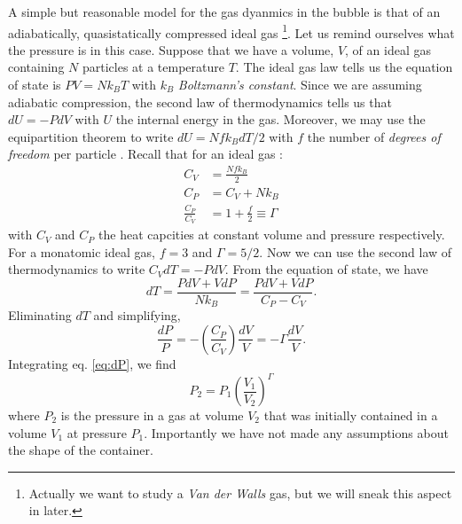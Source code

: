 \documentclass[rmp,aps,nofootinbib,superscriptaddress,floatfix]{revtex4-2}
\begin{document}
A simple but reasonable model for the gas dyanmics in the bubble is that of an adiabatically, quasistatically compressed ideal gas \cite{brenner2002single} \footnote{Actually we want to study a \emph{Van der Walls} gas, but we will sneak this aspect in later.}. Let us remind ourselves what the pressure is in this case. Suppose that we have a volume, $V$, of an ideal gas containing $N$ particles at a temperature $T$. The ideal gas law tells us the equation of state is $PV=Nk_BT$ with $k_B$ \emph{Boltzmann's constant}. Since we are assuming adiabatic compression, the second law of thermodynamics tells us that $dU=-PdV$ with $U$ the internal energy in the gas. Moreover, we may use the equipartition theorem to write $dU=N f k_B dT/2$ with $f$ the number of \emph{degrees of freedom} per particle \cite{}. Recall that for an ideal gas \cite{}:
\begin{equation}
\begin{split}
    C_V &= \frac{N f k_B}{2} \\
    C_P &= C_V+N k_B \\
    \frac{C_P}{C_V} &= 1+\frac{f}{2} \equiv \Gamma 
\end{split}
\end{equation}
with $C_V$ and $C_P$ the heat capcities at constant volume and pressure respectively. For a monatomic ideal gas, $f=3$ and $\Gamma=5/2$. Now we can use the second law of thermodynamics to write $C_V dT = -P dV$. From the equation of state, we have
\begin{equation}
    dT = \frac{PdV+VdP}{Nk_B}=\frac{PdV+VdP}{C_P-C_V}.
\end{equation}
Eliminating $dT$ and simplifying, 
\begin{equation}
    \frac{dP}{P}=-\left(\frac{C_P}{C_V}\right) \frac{dV}{V} = -\Gamma \frac{dV}{V}.
    \label{eq:dP}
\end{equation}
Integrating eq. \ref{eq:dP}, we find 
\begin{equation}
    P_2 = P_1 \left(\frac{V_1}{V_2}\right)^\Gamma
\label{eq:P}
\end{equation}
where $P_2$ is the pressure in a gas at volume $V_2$ that was initially contained in a volume $V_1$ at pressure $P_1$. Importantly we have not made any assumptions about the shape of the container. 
\end{document}
